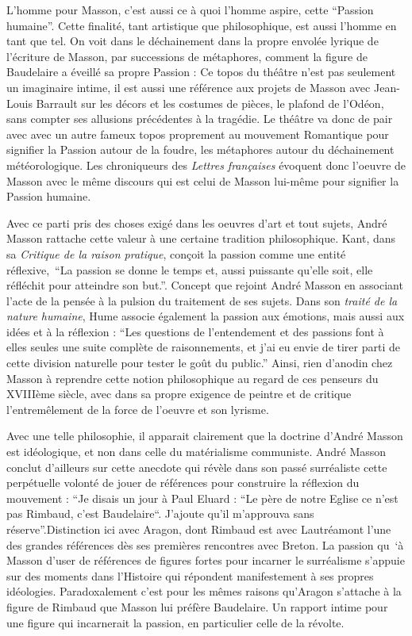 	L’homme pour Masson, c’est aussi ce à quoi l’homme aspire, cette \enquote{Passion humaine}. Cette finalité, tant artistique que philosophique, est aussi l’homme en tant que tel. On voit dans le déchainement dans la propre envolée lyrique de l’écriture de Masson, par successions de métaphores, comment la figure de Baudelaire a éveillé sa propre Passion : Ce topos du théâtre n’est pas seulement un imaginaire intime, il est aussi une référence aux projets de Masson avec Jean-Louis Barrault sur les décors et les costumes de pièces, le plafond de l’Odéon, sans compter ses allusions précédentes à la tragédie. Le théâtre va donc de pair avec avec un autre fameux topos proprement au mouvement Romantique pour signifier la Passion autour de la foudre, les métaphores autour du déchainement météorologique. Les chroniqueurs des \emph{Lettres françaises} évoquent donc l’oeuvre de Masson avec le même discours qui est celui de Masson lui-même pour signifier la Passion humaine. 

Avec ce parti pris des choses exigé dans les oeuvres d’art et tout sujets, André Masson rattache cette valeur à une certaine tradition philosophique. Kant, dans sa \emph{Critique de la raison pratique}, conçoit la passion comme une entité réflexive, \enquote{La passion se donne le temps et, aussi puissante qu’elle soit, elle réfléchit pour atteindre son but.}. Concept que rejoint André Masson en associant l’acte de la pensée à la pulsion du traitement de ses sujets. Dans son \emph{traité de la nature humaine}, Hume associe également la passion aux émotions, mais aussi aux idées et à la réflexion : \enquote{Les questions de l'entendement et des passions font à elles seules une suite complète de raisonnements, et j'ai eu envie de tirer parti de cette division naturelle pour tester le goût du public.} Ainsi, rien d’anodin chez Masson à reprendre cette notion philosophique au regard de ces penseurs du XVIIIème siècle, avec dans sa propre exigence de peintre et de critique l’entremêlement de la force de l’oeuvre et son lyrisme. 


	Avec une telle philosophie, il apparait clairement que la doctrine d’André Masson est idéologique, et non dans celle du matérialisme communiste. André Masson conclut d’ailleurs sur cette anecdote qui révèle dans son passé surréaliste cette perpétuelle volonté de jouer de références pour construire la réflexion du mouvement : \enquote{Je disais un jour à Paul Eluard : “Le père de notre Eglise ce n’est pas Rimbaud, c’est Baudelaire“. J’ajoute qu’il m’approuva sans réserve}.Distinction ici avec Aragon, dont Rimbaud est avec Lautréamont l’une des grandes références dès ses premières rencontres avec Breton. La passion qu ‘à Masson d’user de références de figures fortes pour incarner le surréalisme s’appuie sur des moments dans l’Histoire qui répondent manifestement à ses propres idéologies. Paradoxalement c’est pour les mêmes raisons qu’Aragon s’attache à la figure de Rimbaud que Masson lui préfère Baudelaire. Un rapport intime pour une figure qui incarnerait la passion, en particulier celle de la révolte. 

